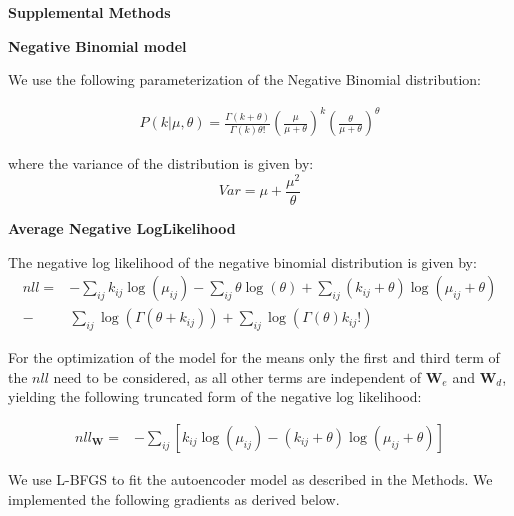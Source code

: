 \documentclass[11pt]{letter}
\newcommand{\matr}[1]{\mathbf{#1}}
\begin{document}
\textbf{Supplemental Methods}

\textbf{Negative Binomial model}

We use the following parameterization of the Negative Binomial distribution:

\begin{align*}
P(k| \mu, \theta) = \frac{\Gamma(k + \theta)}{\Gamma(k) \theta!}  
\left ( \frac{\mu}{\mu + \theta} \right )^{k}
\left ( \frac{\theta}{\mu + \theta} \right)^{\theta} 
\end{align*}

where the variance of the distribution is given by:
\[
Var = \mu + \frac{\mu^2}{\theta}
\]


% 
% 
% 
% 




\textbf{Average Negative LogLikelihood}

The negative log likelihood of the negative binomial distribution is given by:
\begin{align*}
nll=& -\sum_{ij} k_{ij} \log{(\mu_{ij})} - 
\sum_{ij} \theta \log{(\theta)} +
\sum_{ij} (k_{ij} + \theta) \log{(\mu_{ij} + \theta)} \\
-&\sum_{ij} \log{(\Gamma(\theta + k_{ij}))} 
+ \sum_{ij} \log{(\Gamma({\theta}) k_{ij}!)}
\end{align*}


For the optimization of the model for the means only the first and third 
term of the $nll$ need to be considered, as all other terms are independent of 
$\matr{W}_e$ and $\matr{W}_d$, yielding the following truncated form of the 
negative log likelihood:

\begin{align*}
nll_{\matr{W}}=& -\sum_{ij} \left[ k_{ij} \log{(\mu_{ij})} -
 (k_{ij} + \theta) \log{(\mu_{ij} + \theta)} \right]
\end{align*}


We use L-BFGS to fit the autoencoder model as described in the Methods.
We implemented the following gradients as derived below.
\end{document}
